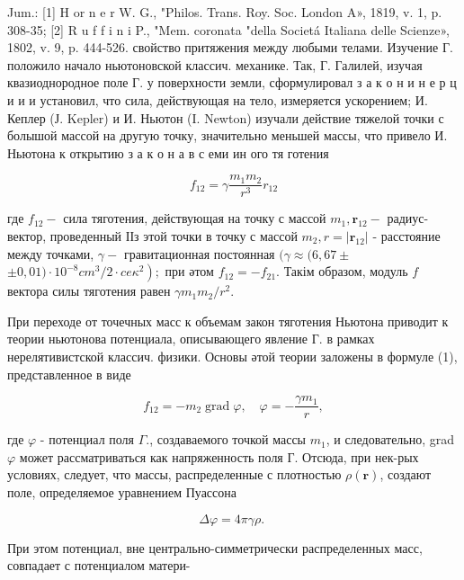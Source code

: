 \documentclass[10pt]{article}
\begin{document}
Jum.: [1] H or n e r W. G., "Philos. Trans. Roy. Soc. London A», 1819, v. 1, p. 308-35; [2] R u f f i n i P., "Mem. coronata "della Societá Italiana delle Scienze», 1802, v. 9, p. 444-526. свойство притяжения между любыми телами. Изучение Г. положило начало ньютоновской классич. механике. Так, Г. Галилей, изучая квазиоднородное поле Г. у поверхности земли, сформулировал з а к о н и н е р ц и и и установил, что сила, действующая на тело, измеряется ускорением; И. Кеплер (Ј. Kepler) и И. Ньютон (I. Newton) изучали действие тяжелой точки с болышой массой на другую точку, значительно меньшей массы, что привело И. Ньютона к открытию з а к о н а в с еми ин ого тя готения



\[

f_{12}=\gamma \frac{m_{1} m_{2}}{r^{3}} r_{12}

\]



где $f_{12}-$ сила тяготения, действующая на точку с массой $m_{1}, \boldsymbol{r}_{12}-$ радиус-вектор, проведенный ІІз этой точки в точку с массой $m_{2}, r=\left|\boldsymbol{r}_{12}\right|$ - расстояние между точками, $\gamma-$ гравитационная постоянная $(\gamma \approx(6,67 \pm$ $\left.\pm 0,01) \cdot 10^{-8} c m^{3} / 2 \cdot c e \kappa^{2}\right) ;$ при әтом $f_{12}=-f_{21}$. Такім образом, модуль $f$ вектора силы тяготения равен $\gamma m_{1} m_{2} / r^{2}$.



При переходе от точечных масс к объемам закон тяготения Ньютона приводит к теории ньютонова потенциала, описывающего явление Г. в рамках нерелятивистской классич. физики. Основы әтой теории заложены в формуле (1), представленное в виде



\[

f_{12}=-m_{2} \operatorname{grad} \varphi, \quad \varphi=-\frac{\gamma m_{1}}{r},

\]



где $\varphi$ - потенциал поля $\Gamma$., создаваемого точкой массы $m_{1}$, и следовательно, grad $\varphi$ может рассматриваться как напряженность поля Г. Отсюда, при нек-рых условиях, следует, что массы, распределенные с плотностью $\rho(\boldsymbol{r})$, создают поле, определяемое уравнением Пуассона



\[

\Delta \varphi=4 \pi \gamma \rho \text {. }

\]



При этом потенциал, вне центрально-симметрически распределенных масс, совпадает с потенциалом матери-
\end{document}
